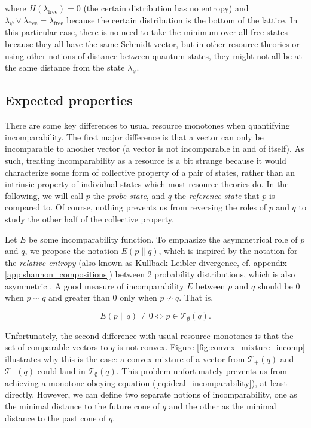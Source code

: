 \noindent where $H(\lambda_\text{free}) = 0$ (the certain distribution has no entropy) and $\lambda_\psi \vee \lambda_\text{free} = \lambda_\text{free}$ because the certain distribution is the bottom of the lattice. In this particular case, there is no need to take the minimum over all free states because they all have the same Schmidt vector, but in other resource theories or using other notions of distance between quantum states, they might not all be at the same distance from the state $\lambda_\psi$.

\subsection{Expected properties}

There are some key differences to usual resource monotones when quantifying incomparability. The first major difference is that a vector can only be incomparable to another vector (a vector is not incomparable in and of itself). As such, treating incomparability as a resource is a bit strange because it would characterize some form of collective property of a pair of states, rather than an intrinsic property of individual states which most resource theories do. In the following, we will call $p$ the \textit{probe state}, and $q$ the \textit{reference state} that $p$ is compared to. Of course, nothing prevents us from reversing the roles of $p$ and $q$ to study the other half of the collective property. 

Let $E$ be some incomparability function. To emphasize the asymmetrical role of $p$ and $q$, we propose the notation $E(p \parallel q)$, which is inspired by the notation for the \textit{relative entropy} (also known as Kullback-Leibler divergence, cf. appendix \ref{app:shannon_compositions}) between 2 probability distributions, which is also asymmetric \cite[p. 19]{cover_elements_2006}. A good measure of incomparability $E$ between $p$ and $q$ should be 0 when $p \sim q$ and greater than 0 only when $p \nsim q$. That is,

\begin{equation} %
    E(p \parallel q) \neq 0 \iff p \in \mathcal{T}_\emptyset(q). \label{eq:ideal_incomparability}
\end{equation}

Unfortunately, the second difference with usual resource monotones is that the set of comparable vectors to $q$ is not convex. Figure \ref{fig:convex_mixture_incomp} illustrates why this is the case: a convex mixture of a vector from $\mathcal{T}_+(q)$ and $\mathcal{T}_-(q)$ could land in $\mathcal{T}_\emptyset(q)$. %
This problem unfortunately prevents us from achieving a monotone obeying equation (\ref{eq:ideal_incomparability}), at least directly. However, we can define two separate notions of incomparability, one as the minimal distance to the future cone of $q$ and the other as the minimal distance to the past cone of $q$.

